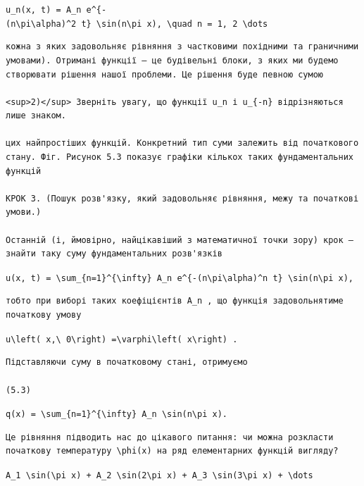 \documentclass[
  ukrainian,
]{article}
\begin{document}
\texttt{u\_n(x,\ t)\ =\ A\_n\ e\^{}\{-(n\textbackslash{}pi\textbackslash{}alpha)\^{}2\ t\}\ \textbackslash{}sin(n\textbackslash{}pi\ x),\ \textbackslash{}quad\ n\ =\ 1,\ 2\ \textbackslash{}dots}

\begin{verbatim}
кожна з яких задовольняє рівняння з частковими похідними та граничними умовами). Отримані функції — це будівельні блоки, з яких ми будемо створювати рішення нашої проблеми. Це рішення буде певною сумою

<sup>2)</sup> Зверніть увагу, що функції u_n і u_{-n} відрізняються лише знаком.

цих найпростіших функцій. Конкретний тип суми залежить від початкового стану. Фіг. Рисунок 5.3 показує графіки кількох таких фундаментальних функцій

КРОК 3. (Пошук розв'язку, який задовольняє рівняння, межу та початкові умови.)

Останній (і, ймовірно, найцікавіший з математичної точки зору) крок — знайти таку суму фундаментальних розв'язків
\end{verbatim}

\texttt{u(x,\ t)\ =\ \textbackslash{}sum\_\{n=1\}\^{}\{\textbackslash{}infty\}\ A\_n\ e\^{}\{-(n\textbackslash{}pi\textbackslash{}alpha)\^{}n\ t\}\ \textbackslash{}sin(n\textbackslash{}pi\ x),}

\begin{verbatim}
тобто при виборі таких коефіцієнтів A_n , що функція задовольнятиме початкову умову
\end{verbatim}

\texttt{u\textbackslash{}left(\ x,\textbackslash{}\ 0\textbackslash{}right)\ =\textbackslash{}varphi\textbackslash{}left(\ x\textbackslash{}right)\ .}

\begin{verbatim}
Підставляючи суму в початковому стані, отримуємо

(5.3)
\end{verbatim}

\texttt{q(x)\ =\ \textbackslash{}sum\_\{n=1\}\^{}\{\textbackslash{}infty\}\ A\_n\ \textbackslash{}sin(n\textbackslash{}pi\ x).}

\begin{verbatim}
Це рівняння підводить нас до цікавого питання: чи можна розкласти початкову температуру \phi(x) на ряд елементарних функцій вигляду?
\end{verbatim}

\texttt{A\_1\ \textbackslash{}sin(\textbackslash{}pi\ x)\ +\ A\_2\ \textbackslash{}sin(2\textbackslash{}pi\ x)\ +\ A\_3\ \textbackslash{}sin(3\textbackslash{}pi\ x)\ +\ \textbackslash{}dots}
\end{document}
